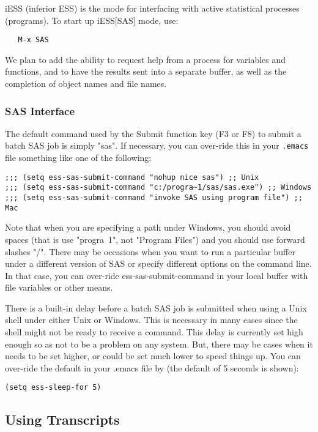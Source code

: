 \documentclass{article}
\begin{document}
iESS (inferior ESS) is the mode for interfacing with active
statistical processes (programs).  To start up iESS[SAS] mode, use:
\begin{verbatim}
   M-x SAS
\end{verbatim}   
We plan to add the ability to request help from a process for
variables and functions, and to have the results sent into a separate
buffer, as well as the completion of object names and file names.

\subsubsection{SAS Interface}
\label{sec:SAS:interface}

The default command used by the Submit function key (F3 or F8) to
submit a batch SAS job is simply "sas".  If necessary, you can
over-ride this in your \verb+.emacs+ file something like one of the
following:
\begin{verbatim}
;;; (setq ess-sas-submit-command "nohup nice sas") ;; Unix
;;; (setq ess-sas-submit-command "c:/progra~1/sas/sas.exe") ;; Windows
;;; (setq ess-sas-submit-command "invoke SAS using program file") ;; Mac
\end{verbatim}
Note that when you are specifying a path under Windows, you should
avoid spaces (that is use "progra~1", not "Program Files") and you
should use forward slashes "/".  There may be occasions when you want
to run a particular buffer under a different version of SAS or specify
different options on the command line.  In that case, you can
over-ride ess-sas-submit-command in your local buffer with file
variables or other means.

There is a built-in delay before a batch SAS job is submitted when using
a Unix shell under either Unix or Windows.  This is necessary in many cases 
since the shell might not be ready to receive a command.  This delay is 
currently set high enough so as not to be a problem on any system.  But,
there may be cases when it needs to be set higher, or could be set much
lower to speed things up.  You can over-ride the default in your .emacs
file by (the default of 5 seconds is shown):
\begin{verbatim}
(setq ess-sleep-for 5)
\end{verbatim}


\subsection{Using Transcripts}
\label{sec:SAS:trans}
\end{document}
